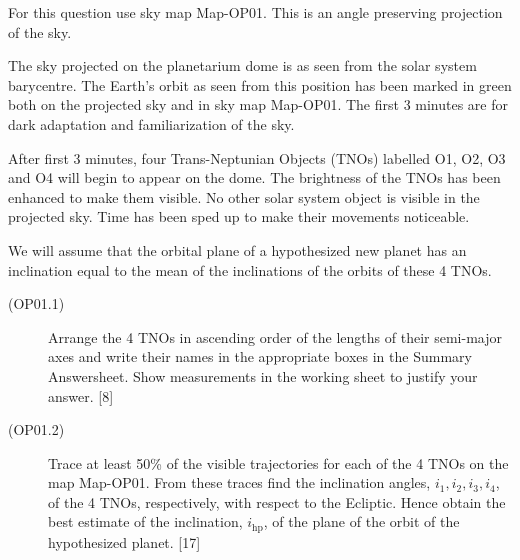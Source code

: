 For this question use sky map Map-OP01. This is an angle preserving
projection of the sky.

The sky projected on the planetarium dome is as seen from the solar system
barycentre. The Earth's orbit as seen from this position has been marked in
green both on the projected sky and in sky map Map-OP01. The first 3 minutes
are for dark adaptation and familiarization of the sky.

After first 3 minutes, four Trans-Neptunian Objects (TNOs) labelled O1, O2,
O3 and O4 will begin to appear on the dome. The brightness of the TNOs has
been enhanced to make them visible. No other solar system object is visible
in the projected sky. Time has been sped up to make their movements
noticeable.

We will assume that the orbital plane of a hypothesized new planet has an
inclination equal to the mean of the inclinations of the orbits of these 4
TNOs.


\begin{description}
\item[(OP01.1)] Arrange the 4 TNOs in ascending order of the lengths of their
  semi-major axes and write their names in the appropriate boxes in the
  Summary Answersheet. Show measurements in the working sheet to justify your
  answer. \hfill[8]
\item[(OP01.2)] Trace at least 50\% of the visible trajectories for each of
  the 4 TNOs on the map Map-OP01. From these traces find the inclination
  angles, $i_1, i_2, i_3, i_4$, of the 4 TNOs, respectively, with respect to
  the Ecliptic. Hence obtain the best estimate of the inclination,
  $i_{\mathrm{hp}}$, of the plane of the orbit of the hypothesized planet.
  \hfill[17]
\end{description}
